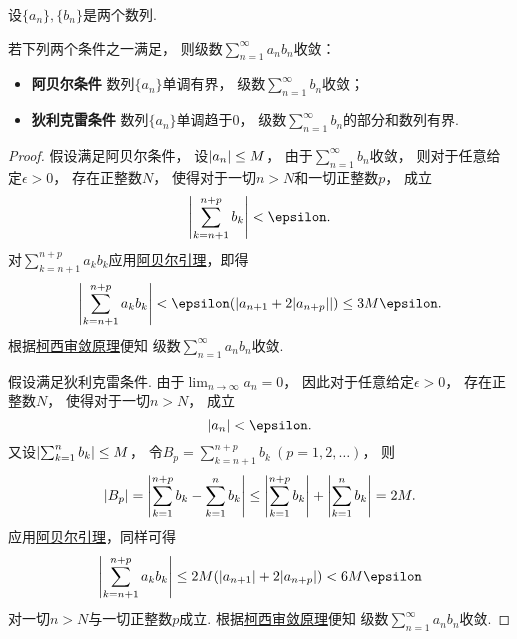 \begin{theorem}\label{theorem:无穷级数.无穷级数的阿贝尔--狄利克雷审敛法}
设\(\{a_n\},\{b_n\}\)是两个数列.

若下列两个条件之一满足，
则级数\(\sum_{n=1}^\infty a_n b_n\)收敛：\begin{itemize}
	\item {\rm\bf 阿贝尔条件}
	数列\(\{a_n\}\)单调有界，
	级数\(\sum_{n=1}^\infty b_n\)收敛；

	\item {\rm\bf 狄利克雷条件}
	数列\(\{a_n\}\)单调趋于\(0\)，
	级数\(\sum_{n=1}^\infty b_n\)的部分和数列有界.
\end{itemize}
\begin{proof}
假设满足阿贝尔条件，
设\(\abs{a_n} \leq M\)，
由于\(\sum_{n=1}^\infty b_n\)收敛，
则对于任意给定\(\epsilon>0\)，
存在正整数\(N\)，
使得对于一切\(n>N\)和一切正整数\(p\)，
成立\begin{equation*}
	\abs{\sum_{k=n+1}^{n+p} b_k} < \epsilon.
\end{equation*}
对\(\sum_{k=n+1}^{n+p} a_k b_k\)应用\hyperref[theorem:无穷级数.阿贝尔引理]{阿贝尔引理}，即得\begin{equation*}
	\abs{\sum_{k=n+1}^{n+p} a_k b_k}
	< \epsilon (\abs{a_{n+1} + 2 \abs{a_{n+p}}})
	\leq 3 M \epsilon.
\end{equation*}
根据\hyperref[theorem:无穷级数.级数的柯西审敛原理]{柯西审敛原理}便知
级数\(\sum_{n=1}^\infty a_n b_n\)收敛.

假设满足狄利克雷条件.
由于\(\lim_{n\to\infty} a_n = 0\)，
因此对于任意给定\(\epsilon>0\)，
存在正整数\(N\)，
使得对于一切\(n>N\)，
成立\begin{equation*}
	\abs{a_n} < \epsilon.
\end{equation*}
又设\(\abs{\sum_{k=1}^n b_k} \leq M\)，
令\(B_p = \sum_{k=n+1}^{n+p} b_k\ (p=1,2,\dotsc)\)，
则\begin{equation*}
	\abs{B_p}
	= \abs{\sum_{k=1}^{n+p} b_k - \sum_{k=1}^n b_k}
	\leq \abs{\sum_{k=1}^{n+p} b_k} + \abs{\sum_{k=1}^n b_k}
	= 2 M.
\end{equation*}
应用\hyperref[theorem:无穷级数.阿贝尔引理]{阿贝尔引理}，同样可得\begin{equation*}
	\abs{\sum_{k=n+1}^{n+p} a_k b_k}
	\leq 2 M (\abs{a_{n+1}} + 2 \abs{a_{n+p}})
	< 6 M \epsilon
\end{equation*}对一切\(n>N\)与一切正整数\(p\)成立.
根据\hyperref[theorem:无穷级数.级数的柯西审敛原理]{柯西审敛原理}便知
级数\(\sum_{n=1}^\infty a_n b_n\)收敛.
\end{proof}
\end{theorem}
